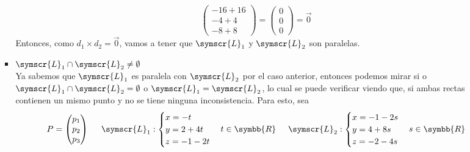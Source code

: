 \documentclass{article}
\def\fancyL{\symscr{L}}
\def\realR{\symbb{R}}
\begin{document}
\begin{enumerate}
\begin{itemize}
\begin{itemize}
\[\begin{pmatrix}
                            -16 + 16 \\
                            -4 + 4 \\
                            -8 + 8
                        \end{pmatrix}
                        =
                        \begin{pmatrix}
                            0 \\ 0 \\ 0
                        \end{pmatrix}
                        = 
                        \vec{0}
                    \]
                    Entonces, como \(d_1 \times d_2 = \vec{0}\), vamos a tener que \(\fancyL_1\) y \(\fancyL_2\) son paralelas.
                \item \(\fancyL_1 \cap \fancyL_2 \neq \emptyset\) \\
                    Ya sabemos que \(\fancyL_1\) es paralela con \(\fancyL_2\) por el caso anterior, entonces podemos mirar si o
                    \(\fancyL_1 \cap \fancyL_2 = \emptyset\) o \(\fancyL_1 = \fancyL_2\), lo cual se puede verificar viendo que, 
                    si ambas rectas contienen un mismo punto y no se tiene ninguna inconsistencia. Para esto, sea 
                    \[
                        P = \begin{pmatrix}
                            p_1 \\ p_2 \\ p_3
                        \end{pmatrix}
                        \hspace{0.5cm}
                        \fancyL_1:
                        \begin{cases}
                            x = -t \\
                            y = 2 + 4t \\
                            z = -1 -2t 
                        \end{cases}
                        t \in \realR
                        \hspace{0.5cm}
                        \fancyL_2:
                        \begin{cases}
                            x = -1 -2s \\
                            y = 4 + 8s \\
                            z = -2 -4s 
                        \end{cases}
                        s \in \realR
\]
\end{itemize}
\end{itemize}
\end{enumerate}
\end{document}

